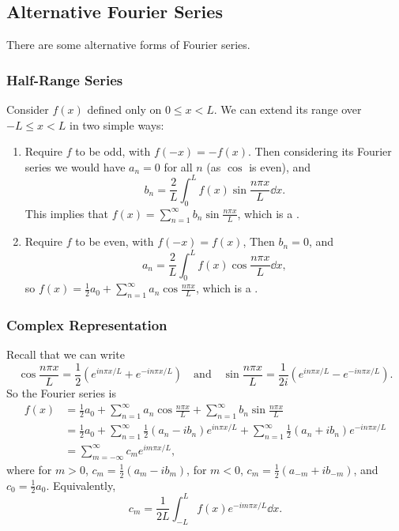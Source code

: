 \documentclass[a4paper]{scrartcl}
\begin{document}
\subsection{Alternative Fourier Series}

There are some alternative forms of Fourier series.

\subsubsection*{Half-Range Series}

Consider $f(x)$ defined only on $0 \leq x < L$. We can extend its range over $-L \leq x < L$ in two simple ways:
\begin{enumerate}
    \item Require $f$ to be odd, with $f(-x) = -f(x)$. Then considering its Fourier series we would have $a_n = 0$ for all $n$ (as $\cos$ is even), and
    $$
    b_{n}=\frac{2}{L} \int_{0}^{L} f(x) \sin \frac{n \pi x}{L} \dd x.
    $$
    This implies that $f(x) = \sum_{n= 1}^{\infty} b_n \sin \frac{n \pi x}{L}$, which is a .
    \item Require $f$ to be even, with $f(-x) = f(x)$, Then $b_n = 0$, and
    $$
    a_{n}=\frac{2}{L} \int_{0}^{L} f(x) \cos \frac{n \pi x}{L} \dd x,
    $$
    so $f(x) = \frac{1}{2}a_0 + \sum_{n = 1}^{\infty} a_n \cos\frac{n \pi x}{L}$, which is a .
\end{enumerate}

\subsubsection*{Complex Representation}

Recall that we can write
$$
\cos \frac{n \pi x}{L} = \frac{1}{2}\left(e^{in \pi x/L} + e^{-i n \pi x/L}\right) \quad \text{and} \quad \sin \frac{n \pi x}{L} = \frac{1}{2i} \left(e^{i n \pi x/L} - e^{-i n \pi x/L} \right).
$$
So the Fourier series is
\begin{align*}
    f(x) &= \frac{1}{2} a_{0}+\sum_{n=1}^{\infty} a_{n} \cos \frac{n \pi x}{L}+\sum_{n=1}^{\infty} b_{n} \sin \frac{n \pi x}{L} \\
    &= \frac{1}{2} a_{0}+\sum_{n=1}^{\infty}\frac{1}{2}\left(a_{n}-i b_{n}\right) e^{i n \pi x / L}+\sum_{n=1}^{\infty}\frac{1}{2}\left(a_{n}+i b_{n}\right) e^{-i n \pi  x / L} \\
    &= \sum_{m=-\infty}^{\infty} c_{m} e^{i m \pi x / L},
\end{align*}
where for $m > 0$, $c_m = \frac{1}{2}(a_m - i b_m)$, for $m < 0$, $c_m = \frac{1}{2}(a_{-m} + i b_{-m})$, and $c_0 = \frac{1}{2}a_0$. Equivalently,
$$
c_m = \frac{1}{2L} \int_{-L}^L f(x) e^{-i m \pi x/L } \dd x.
$$
\end{document}
